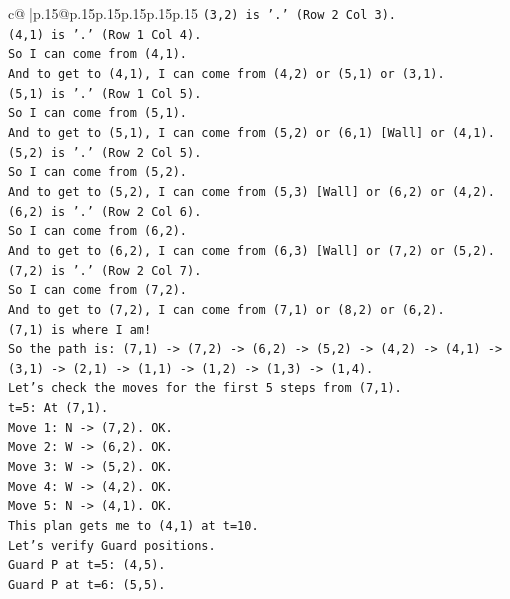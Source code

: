 \documentclass{article}
\begin{document}
{\begin{supertabular}{c@{$\;$}|p{.15\linewidth}@{}p{.15\linewidth}p{.15\linewidth}p{.15\linewidth}p{.15\linewidth}p{.15\linewidth}}
{{{\texttt{(3,2) is '.' (Row 2 Col 3).} \\
\texttt{(4,1) is '.' (Row 1 Col 4).} \\
\texttt{So I can come from (4,1).} \\
\texttt{And to get to (4,1), I can come from (4,2) or (5,1) or (3,1).} \\
\texttt{(5,1) is '.' (Row 1 Col 5).} \\
\texttt{So I can come from (5,1).} \\
\texttt{And to get to (5,1), I can come from (5,2) or (6,1) {[}Wall{]} or (4,1).} \\
\texttt{(5,2) is '.' (Row 2 Col 5).} \\
\texttt{So I can come from (5,2).} \\
\texttt{And to get to (5,2), I can come from (5,3) {[}Wall{]} or (6,2) or (4,2).} \\
\texttt{(6,2) is '.' (Row 2 Col 6).} \\
\texttt{So I can come from (6,2).} \\
\texttt{And to get to (6,2), I can come from (6,3) {[}Wall{]} or (7,2) or (5,2).} \\
\texttt{(7,2) is '.' (Row 2 Col 7).} \\
\texttt{So I can come from (7,2).} \\
\texttt{And to get to (7,2), I can come from (7,1) or (8,2) or (6,2).} \\
\texttt{(7,1) is where I am!} \\
\texttt{So the path is: (7,1) {-}> (7,2) {-}> (6,2) {-}> (5,2) {-}> (4,2) {-}> (4,1) {-}> (3,1) {-}> (2,1) {-}> (1,1) {-}> (1,2) {-}> (1,3) {-}> (1,4).} \\
\texttt{Let's check the moves for the first 5 steps from (7,1).} \\
\texttt{t=5: At (7,1).} \\
\texttt{Move 1: N {-}> (7,2). OK.} \\
\texttt{Move 2: W {-}> (6,2). OK.} \\
\texttt{Move 3: W {-}> (5,2). OK.} \\
\texttt{Move 4: W {-}> (4,2). OK.} \\
\texttt{Move 5: N {-}> (4,1). OK.} \\
\texttt{This plan gets me to (4,1) at t=10.} \\
\texttt{Let's verify Guard positions.} \\
\texttt{Guard P at t=5: (4,5).} \\
\texttt{Guard P at t=6: (5,5).} \\
}}}
\end{supertabular}}
\end{document}
